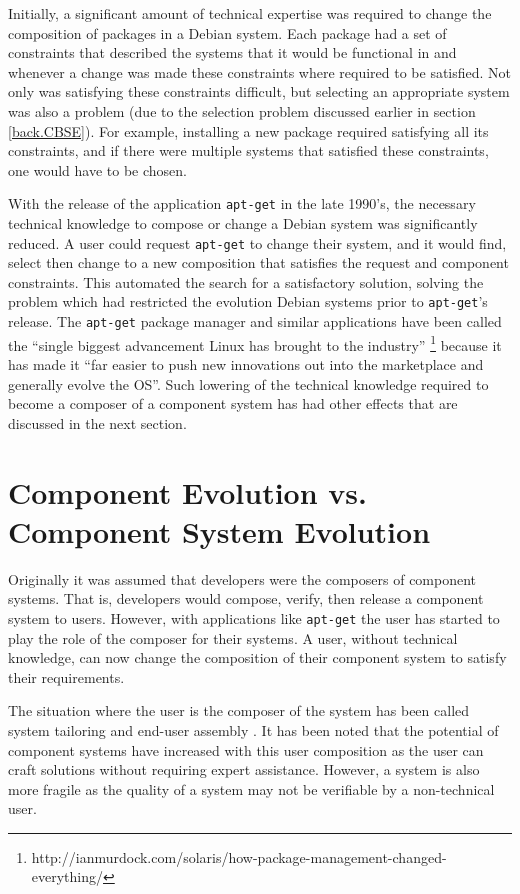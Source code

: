 Initially, a significant amount of technical expertise was required to change the composition of packages in a Debian system.
Each package had a set of constraints that described the systems that it would be functional in
and whenever a change was made these constraints where required to be satisfied.  
Not only was satisfying these constraints difficult, but selecting an appropriate system was also a problem (due to the selection problem discussed earlier in section \ref{back.CBSE}).
For example, installing a new package required satisfying all its constraints, and if there were multiple systems that satisfied these constraints, one would have to be chosen.

With the release of the application \texttt{apt-get} in the late 1990's, the necessary technical knowledge to compose or change a Debian system was significantly reduced.
A user could request \texttt{apt-get} to change their system, and it would find, select then change to a new composition that satisfies the request and component constraints.
This automated the search for a satisfactory solution, solving the problem which had restricted the evolution Debian systems prior to \texttt{apt-get}'s release.
The \texttt{apt-get} package manager and similar applications have been called the ``single biggest advancement Linux has brought to the industry'' 
\footnote{http://ianmurdock.com/solaris/how-package-management-changed-everything/} 
because it has made it ``far easier to push new innovations out into the marketplace and generally evolve the OS''.
Such lowering of the technical knowledge required to become a composer of a component system has had other effects that are discussed in the next section.

\section{Component Evolution vs. Component System Evolution}
\label{background.componentsystemevolution}
Originally it was assumed that developers were the composers \citep{Parnas1972,PrietoDiaz1987} of component systems.
That is, developers would compose, verify, then release a component system to users.
However, with applications like \texttt{apt-get} the user has started to play the role of the composer for their systems.
A user, without technical knowledge, can now change the composition of their component system to satisfy their requirements.

The situation where the user is the composer of the system has been called system tailoring \citep{Morch1997} and end-user assembly \citep{Szyperski2002}. 
It has been noted that the potential of component systems have increased with this user composition \citep{Szyperski2002} as the user can craft solutions without requiring expert assistance.
However, a system is also more fragile as the quality of a system may not be verifiable by a non-technical user.

